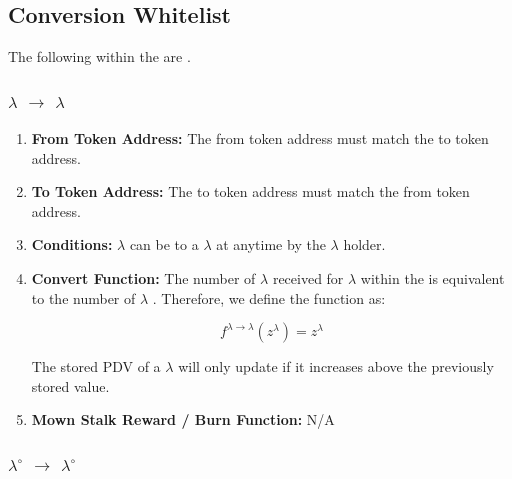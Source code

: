 \documentclass[class=article, crop=false]{standalone}
\begin{document}

\subsection{Conversion Whitelist} 

The following  within the  are .


\subsubsection{$\lambda$ $\rightarrow$ $\lambda$}

\begin{enumerate}

    \item \textbf{From Token Address:} The from token address must match the to token address.
    
    \item \textbf{To Token Address:} The to token address must match the from token address.
    
    \item \textbf{Conditions:}  $\lambda$ can be  to a $\lambda$  at anytime by the $\lambda$  holder. 
    
    \item \textbf{Convert Function:} The number of $\lambda$ received for   $\lambda$ within the  is equivalent to the number of $\lambda$ . Therefore, we define the function as:
    
        $$
            f^{\lambda \rightarrow \lambda}(z^{\lambda}) = 
                z^{\lambda}
        $$

        The stored PDV of a $\lambda$  will only update if it increases above the previously stored value.

    \item \textbf{Mown Stalk Reward / Burn Function:} N/A
    
\end{enumerate}


\subsubsection{$\lambda^{\circ}$ $\rightarrow$ $\lambda^{\circ}$}
\end{document}
